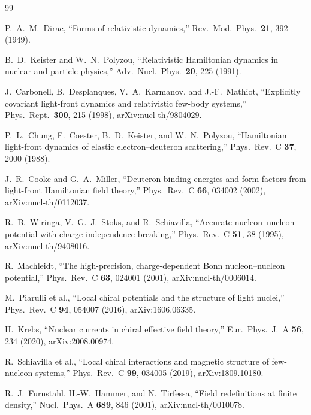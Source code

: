 \documentclass[11pt]{article}
\begin{document}
\small
\begin{thebibliography}{99}

P.~A.~M.~Dirac,
``Forms of relativistic dynamics,''
Rev.\ Mod.\ Phys.\ \textbf{21}, 392 (1949).

B.~D.~Keister and W.~N.~Polyzou,
``Relativistic Hamiltonian dynamics in nuclear and particle physics,''
Adv.\ Nucl.\ Phys.\ \textbf{20}, 225 (1991).

J.~Carbonell, B.~Desplanques, V.~A.~Karmanov, and J.-F.~Mathiot,
``Explicitly covariant light-front dynamics and relativistic few-body
systems,''
Phys.\ Rept.\ \textbf{300}, 215 (1998), arXiv:nucl-th/9804029.

P.~L.~Chung, F.~Coester, B.~D.~Keister, and W.~N.~Polyzou,
``Hamiltonian light-front dynamics of elastic electron--deuteron scattering,''
Phys.\ Rev.\ C \textbf{37}, 2000 (1988).

J.~R.~Cooke and G.~A.~Miller,
``Deuteron binding energies and form factors from light-front Hamiltonian
field theory,''
Phys.\ Rev.\ C \textbf{66}, 034002 (2002), arXiv:nucl-th/0112037.

R.~B.~Wiringa, V.~G.~J.~Stoks, and R.~Schiavilla,
``Accurate nucleon--nucleon potential with charge-independence breaking,''
Phys.\ Rev.\ C \textbf{51}, 38 (1995), arXiv:nucl-th/9408016.

R.~Machleidt,
``The high-precision, charge-dependent Bonn nucleon--nucleon potential,''
Phys.\ Rev.\ C \textbf{63}, 024001 (2001), arXiv:nucl-th/0006014.

M.~Piarulli et al.,
``Local chiral potentials and the structure of light nuclei,''
Phys.\ Rev.\ C \textbf{94}, 054007 (2016), arXiv:1606.06335.

H.~Krebs,
``Nuclear currents in chiral effective field theory,''
Eur.\ Phys.\ J.\ A \textbf{56}, 234 (2020), arXiv:2008.00974.

R.~Schiavilla et al.,
``Local chiral interactions and magnetic structure of few-nucleon systems,''
Phys.\ Rev.\ C \textbf{99}, 034005 (2019), arXiv:1809.10180.

R.~J.~Furnstahl, H.-W.~Hammer, and N.~Tirfessa,
``Field redefinitions at finite density,''
Nucl.\ Phys.\ A \textbf{689}, 846 (2001), arXiv:nucl-th/0010078.


\end{thebibliography}
\end{document}
